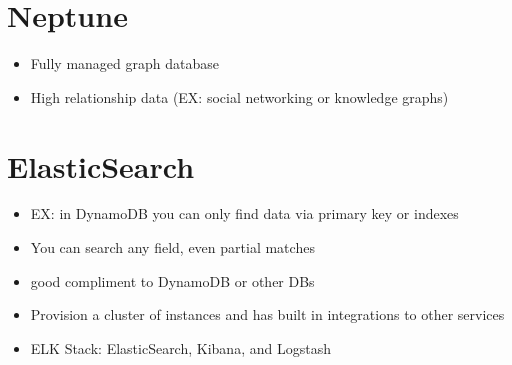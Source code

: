 \documentclass[]{scrartcl}
\begin{document}
\section{Neptune}
\begin{itemize}
	\item Fully managed graph database
	\item High relationship data (EX: social networking or knowledge graphs)
\end{itemize}

\section{ElasticSearch}
\begin{itemize}
	\item EX: in DynamoDB you can only find data via primary key or indexes
	\item You can search any field, even partial matches
	\item good compliment to DynamoDB or other DBs
	\item Provision a cluster of instances and has built in integrations to other services
	\item ELK Stack: ElasticSearch, Kibana, and Logstash
\end{itemize}
\end{document}
